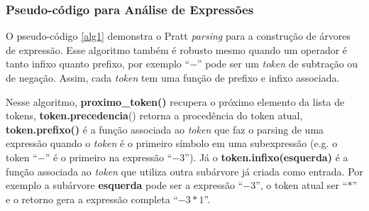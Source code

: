 \documentclass[english, 
               brazil, 
               bsc] %
               {dcomp-abntex2}
\begin{document}
%
%
%
%

\subsubsection{Pseudo-código para Análise de Expressões}

O pseudo-código \ref{alg1}
demonstra o Pratt \textit{parsing} para a construção de árvores de expressão. Esse algoritmo também é robusto mesmo quando um operador é tanto infixo quanto prefixo, por exemplo ``$-$'' pode ser um \textit{token} de subtração ou de negação. Assim, cada \textit{token} tem uma função de prefixo e infixo associada.

Nesse algoritmo, 
\textbf{proximo\_token()} recupera o próximo elemento da lista de tokens,
\textbf{token.precedencia}() retorna a procedência do token atual, \textbf{token.prefixo()} é a função associada ao \textit{token} que faz o parsing de uma expressão quando o \textit{token} é o primeiro símbolo em uma subexpressão (e.g. o token ``$-$'' é o primeiro na expressão ``$-3$''). Já o \textbf{token.infixo(esquerda)} é a função associada ao \textit{token} que utiliza outra subárvore já criada como entrada. Por exemplo a subárvore \textbf{esquerda} pode ser a expressão ``$-3$'', o token atual ser ``$*$'' e o retorno gera a expressão completa ``$-3 * 1$''.
\end{document}
